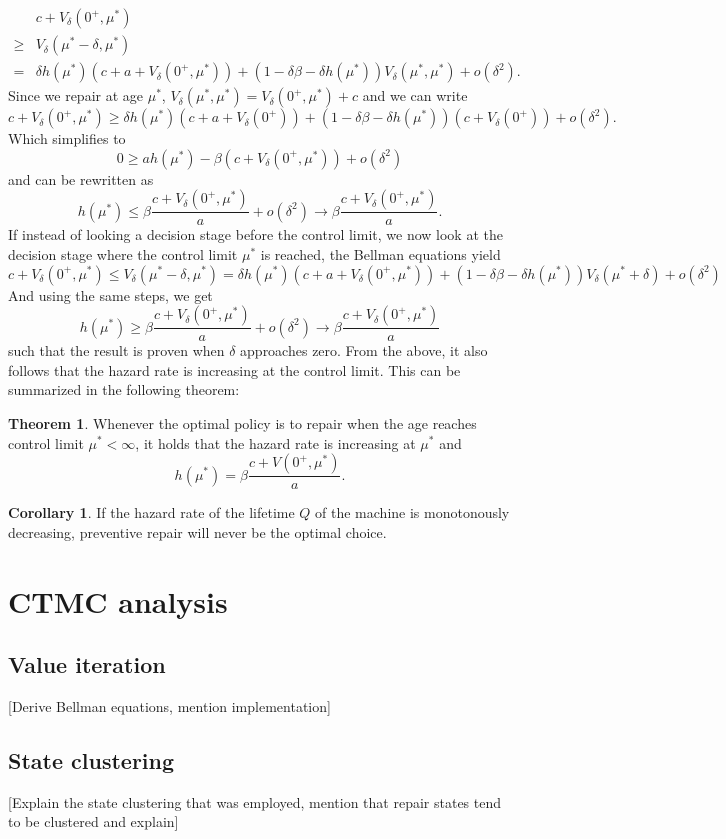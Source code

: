 \documentclass[a4paper]{thesis}
\theoremstyle{definition}
\newtheorem{corollary}{Corollary}[chapter]
\newtheorem{theorem}{Theorem}[section]
\begin{document}
\begin{appendices}
\[\begin{split}
&c+V_\delta(0^+,\mu^*)\\
\geq& V_\delta(\mu^*-\delta,\mu^*)\\
=&\delta h(\mu^*)(c+a+ V_\delta(0^+,\mu^*))+(1-\delta\beta-\delta h(\mu^*)) V_\delta(\mu^*,\mu^*)+o(\delta^2).
\end{split}
\]
Since we repair at age $\mu^*$, $V_\delta(\mu^*,\mu^*)=V_\delta(0^+,\mu^*)+c$ and we can write
$$
c+V_\delta(0^+,\mu^*)\geq \delta h(\mu^*)(c+a+ V_\delta(0^+))+(1-\delta\beta-\delta h(\mu^*)) (c+V_\delta(0^+))+o(\delta^2).
$$
Which simplifies to
$$
0\geq ah(\mu^*)-\beta (c+V_\delta(0^+,\mu^*))+o(\delta^2)
$$
and can be rewritten as
$$
h(\mu^*)\leq \beta\frac{c+V_\delta(0^+,\mu^*)}{a} +o(\delta^2)\rightarrow\beta\frac{c+V_\delta(0^+,\mu^*)}{a}.
$$
If instead of looking a decision stage before the control limit, we now look at the decision stage where the control limit $\mu^*$ is reached, the Bellman equations yield
$$
c+V_\delta(0^+,\mu^*)\leq V_\delta(\mu^*-\delta,\mu^*)=\delta h(\mu^*)(c+a+ V_\delta(0^+,\mu^*))+(1-\delta\beta-\delta h(\mu^*)) V_\delta(\mu^*+\delta)+o(\delta^2)
$$
And using the same steps, we get
$$
h(\mu^*)\geq \beta\frac{c+V_\delta(0^+,\mu^*)}{a} +o(\delta^2)\rightarrow\beta\frac{c+V_\delta(0^+,\mu^*)}{a}
$$
such that the result is proven when $\delta$ approaches zero.
From the above, it also follows that the hazard rate is increasing at the control limit.
This can be summarized in the following theorem:

\begin{theorem}
	Whenever the optimal policy is to repair when the age reaches control limit $\mu^*<\infty$, it holds that the hazard rate is increasing at $\mu^*$ and
	\[h(\mu^*)=\beta\frac{c+V(0^+,\mu^*)}{a}.\]
\end{theorem}

\begin{corollary}
	If the hazard rate of the lifetime $Q$ of the machine is monotonously decreasing, preventive repair will never be the optimal choice.
\end{corollary} \chapter{CTMC analysis}
\section{Value iteration}
[Derive Bellman equations, mention implementation]
\section{State clustering}
[Explain the state clustering that was employed, mention that repair states tend to be clustered and explain]

\end{appendices}
\end{document}
